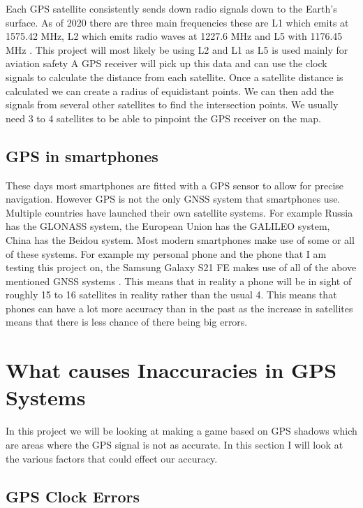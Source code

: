 \documentclass{l4proj}
\begin{document}
Each GPS satellite consistently sends down radio signals down to the Earth's surface. As of 2020 there are three main frequencies
these are L1 which emits at 1575.42 MHz, L2 which emits radio waves at 1227.6 MHz and L5 with 1176.45 MHz \citep{spsStandard}. This project
will most likely be using L2 and L1 as L5 is used mainly for aviation safety \citep{Xu2016} A GPS receiver will pick up this data and can use the clock signals to calculate the distance from each satellite. Once a 
satellite distance is calculated we can create a radius of equidistant points. We can then add the signals from several other
satellites to find the intersection points. We usually need 3 to 4 satellites to be able to pinpoint the GPS receiver on the map. \citep{Rabbany2006}




\subsection{GPS in smartphones}
These days most smartphones are fitted with a GPS sensor to allow for precise navigation. However GPS is not the only GNSS
system that smartphones use. Multiple countries have launched their own satellite systems. For example Russia has the GLONASS
system, the European Union has the GALILEO system, China has the Beidou system. Most modern smartphones make use
of some or all of these systems. For example my personal phone and the phone that I am testing this project on, the Samsung 
Galaxy S21 FE makes use of all of the above mentioned GNSS systems \citep{samsungs21specs}. This means that in reality
a phone will be in sight of roughly 15 to 16 satellites in reality rather than the usual 4. This means that phones can
have a lot more accuracy than in the past as the increase in satellites means that there is less chance of there being big
errors.

\section{What causes Inaccuracies in GPS Systems}
In this project we will be looking at making a game based on GPS shadows which are areas where the GPS signal is not as accurate. In this section I will look
at the various factors that could effect our accuracy.

\subsection{GPS Clock Errors}
\end{document}
